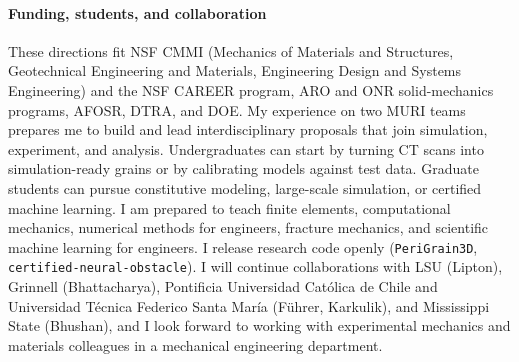 \documentclass[11pt]{article}
\begin{document}
\paragraph{Funding, students, and collaboration}
These directions fit NSF CMMI (Mechanics of Materials and Structures,
Geotechnical Engineering and Materials, Engineering Design and Systems
Engineering) and the NSF CAREER program, ARO and ONR solid-mechanics programs,
AFOSR, DTRA, and DOE. My experience on two MURI teams prepares me to build and
lead interdisciplinary proposals that join simulation, experiment, and analysis.
Undergraduates can start by turning CT scans into simulation-ready grains or by
calibrating models against test data. Graduate students can pursue constitutive
modeling, large-scale simulation, or certified machine learning. I am prepared
to teach finite elements, computational mechanics, numerical methods for
engineers, fracture mechanics, and scientific machine learning for engineers. I release research code openly
(\texttt{PeriGrain3D}, \texttt{certified-neural-obstacle}). I will continue
collaborations with LSU (Lipton), Grinnell (Bhattacharya), Pontificia
Universidad Cat\'olica de Chile and Universidad T\'ecnica Federico Santa
Mar\'ia (F\"uhrer, Karkulik), and Mississippi State (Bhushan), and I look
forward to working with experimental mechanics and materials colleagues in a
mechanical engineering department.

\vspace{-8pt}
\end{document}
